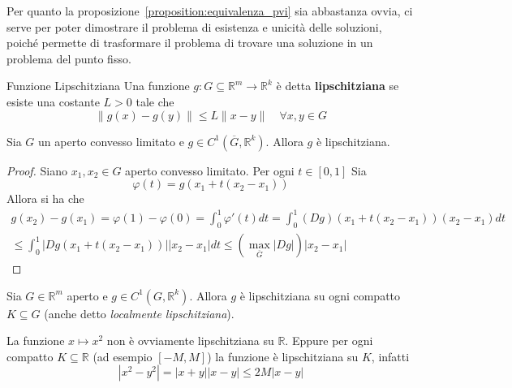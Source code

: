 Per quanto la proposizione~\ref{proposition:equivalenza_pvi} sia abbastanza
ovvia, ci serve per poter dimostrare il problema di esistenza e unicità delle
soluzioni, poiché permette di trasformare il problema di trovare una soluzione
in un problema del punto fisso.

\begin{definition}{Funzione Lipschitziana}
Una funzione \(g: G \subseteq \mathbb{R}^{m} \to \mathbb{R}^{k} \) è detta
\textbf{lipschitziana} se esiste una costante \(L > 0\) tale che 
\[
    \|g(x) - g(y)\| \le L \|x - y\| \quad \forall x, y \in G
\]
\end{definition}
\begin{proposition}
    Sia \(G\) un aperto convesso limitato e \(g \in C^{1}(\overline{G},
    \mathbb{R}^{k})\). Allora \(g\) è lipschitziana.
\end{proposition}
\begin{proof}
    Siano \(x_{1}, x_{2} \in G\) aperto convesso limitato.
    Per ogni \(t \in [0, 1]\) Sia
    \[
        \varphi(t) = g(x_{1} + t(x_{2} - x_{1}))
    \]
    Allora si ha che
    \begin{align*}
        g(x_{2}) - g(x_{1}) = \varphi(1) - \varphi(0) =
        \int_{0}^{1}\varphi'(t)dt = \int_{0}^{1} (Dg)(x_{1} +
        t(x_{2}-x_{1}))(x_{2}-x_{1})dt \\
        \le \int_{0}^{1} |Dg(x_{1} + t(x_{2}-x_{1}))| |x_{2}-x_{1}| dt \le
        \left(\max_{\overline{G}} |Dg|\right) |x_{2}-x_{1}|
    \end{align*}
\end{proof}
\begin{proposition}
    Sia \(G \in \mathbb{R}^{m}\) aperto e \(g \in C^{1}(G, \mathbb{R}^{k})\).
    Allora \(g\) è lipschitziana su ogni compatto \(K \subseteq G\) (anche detto
    \emph{localmente lipschitziana}).
\end{proposition}
\begin{example}
    La funzione \(x \mapsto x^2\) non è ovviamente lipschitziana su
    \(\mathbb{R}\). Eppure per ogni compatto \(K \subseteq \mathbb{R}\) (ad
    esempio \([-M, M]\)) la funzione è lipschitziana su \(K\), infatti 
    \[
        |x^2 - y^2| = |x+y||x-y| \le 2M|x-y|
    \]
\end{example}


